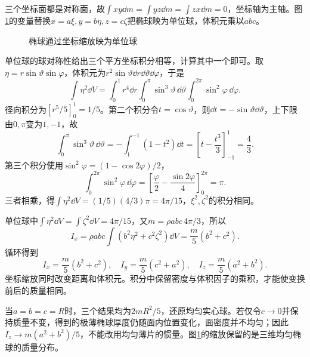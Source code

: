 \begin{solution}
三个坐标面都是对称面，故$\int xy\dd m=\int yz\dd m=\int zx\dd m=0$，坐标轴为主轴。图\ref{fig:hw6-4-s}的变量替换$x=a\xi,y=b\eta,z=c\zeta$把椭球映为单位球，体积元乘以$abc$。

\begin{figure}[H]\centering
{}
\caption{椭球通过坐标缩放映为单位球}\label{fig:hw6-4-s}
\end{figure}

单位球的球对称性给出三个平方坐标积分相等，计算其中一个即可。取$\eta=r\sin\vartheta\sin\varphi$，体积元为$r^2\sin\vartheta\dd r\dd\vartheta\dd\varphi$，于是
\[
\int\eta^2\dd V
=\int_0^1r^4\dd r\int_0^\pi\sin^3\vartheta\,\dd\vartheta
\int_0^{2\pi}\sin^2\varphi\,\dd\varphi.
\]
径向积分为$[r^5/5]_0^1=1/5$。第二个积分令$t=\cos\vartheta$，则$\dd t=-\sin\vartheta\dd\vartheta$，上下限由$0,\pi$变为$1,-1$，故
\[
\int_0^\pi\sin^3\vartheta\,\dd\vartheta
=-\int_1^{-1}(1-t^2)\dd t
=\left[t-\frac{t^3}{3}\right]_{-1}^{1}=\frac43.
\]
第三个积分使用$\sin^2\varphi=(1-\cos2\varphi)/2$，
\[
\int_0^{2\pi}\sin^2\varphi\,\dd\varphi
=\left[\frac\varphi2-\frac{\sin2\varphi}{4}\right]_0^{2\pi}=\pi.
\]
三者相乘，得$\int\eta^2\dd V=(1/5)(4/3)\pi=4\pi/15$，$\xi^2,\zeta^2$的积分相同。

单位球中$\int\eta^2\dd V=\int\zeta^2\dd V=4\pi/15$，又$m=\rho abc\,4\pi/3$，所以
\[
 I_x=\rho abc\int(b^2\eta^2+c^2\zeta^2)\dd V
 =\frac m5(b^2+c^2).
\]
循环得到
\[
 \boxed{I_x=\frac m5(b^2+c^2),\quad I_y=\frac m5(c^2+a^2),
 \quad I_z=\frac m5(a^2+b^2)}.
\]
坐标缩放同时改变距离和体积元。积分中保留密度与体积因子的乘积，才能使变换前后的质量相同。


当$a=b=c=R$时，三个结果均为$2mR^2/5$，还原均匀实心球。若仅令$c\to0$并保持质量不变，得到的极薄椭球厚度仍随面内位置变化，面密度并不均匀；因此$I_z\to m(a^2+b^2)/5$，不能改用均匀薄片的惯量。图\ref{fig:hw6-4-s}的缩放保留的是三维均匀椭球的质量分布。

\end{solution}



